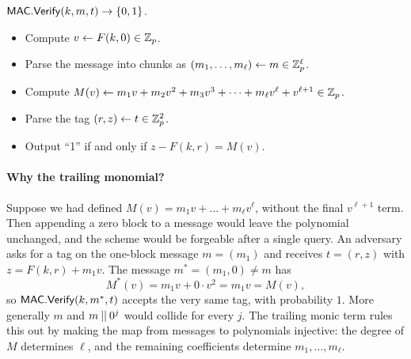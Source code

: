 \medskip
\noindent
$\mathsf{MAC.Verify}(k, m, t) \to \{0,1\}$.
\begin{itemize}[noitemsep]
  \item Compute $v \gets F(k, 0) \in \mathbb{Z}_p$.
  \item Parse the message into chunks as $(m_1, \dots, m_{\ell}) \gets m \in \mathbb{Z}_p^\ell$.
  \item Compute $M(v) \gets m_1 v + m_2 v^2 + m_3 v^3 + \cdots
        + m_{\ell} v^{\ell} + v^{\ell+1} \in \mathbb{Z}_p$. \\
  \item Parse the tag $(r, z) \gets t \in \mathbb{Z}^2_p$.
  \item Output ``1'' if and only if $z - F(k, r) = M(v)$. 
\end{itemize}

\paragraph{Why the trailing monomial?}
Suppose we had defined $M(v) = m_1 v + \dots + m_{\ell} v^{\ell}$, without
the final $v^{\ell+1}$ term.  Then appending a zero block to a message would
leave the polynomial unchanged, and the scheme would be forgeable after a
single query.  An adversary asks for a tag on the one-block message
$m = (m_1)$ and receives $t = (r, z)$ with $z = F(k,r) + m_1 v$.  The message
$m^* = (m_1, 0) \neq m$ has
\[
  M^*(v) = m_1 v + 0 \cdot v^2 = m_1 v = M(v),
\]
so $\mathsf{MAC.Verify}(k, m^*, t)$ accepts the very same tag, with probability $1$.
More generally $m$ and $m \mathbin{||} 0^j$ would collide for every $j$.
The trailing monic term rules this out by making the map from messages to
polynomials injective: the degree of $M$ determines $\ell$, and the
remaining coefficients determine $m_1, \dots, m_{\ell}$.


